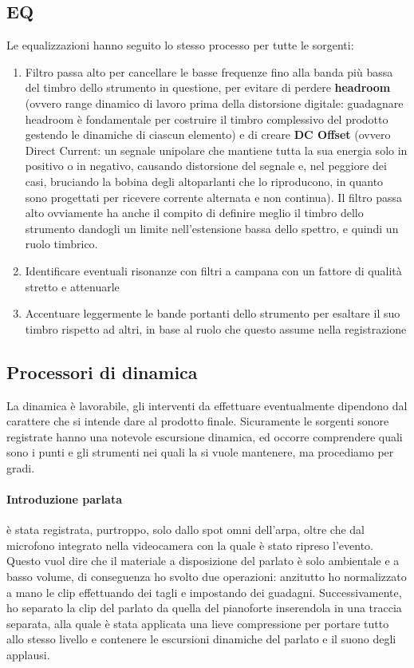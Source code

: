 	\subsection{EQ}
	Le equalizzazioni hanno seguito lo stesso processo per tutte le sorgenti:
		\begin{enumerate}
			\item Filtro passa alto per cancellare le basse frequenze fino alla banda più bassa del timbro dello strumento in questione, per evitare di perdere \textbf{headroom} (ovvero range dinamico di lavoro prima della distorsione digitale: guadagnare headroom è fondamentale per costruire il timbro complessivo del prodotto gestendo le dinamiche di ciascun elemento) e di creare \textbf{DC Offset} (ovvero Direct Current: un segnale unipolare che mantiene tutta la sua energia solo in positivo o in negativo, causando distorsione del segnale e, nel peggiore dei casi, bruciando la bobina degli altoparlanti che lo riproducono, in quanto sono progettati per ricevere corrente alternata e non continua). Il filtro passa alto ovviamente ha anche il compito di definire meglio il timbro dello strumento dandogli un limite nell'estensione bassa dello spettro, e quindi un ruolo timbrico.
			\item Identificare eventuali risonanze con filtri a campana con un fattore di qualità stretto e attenuarle
			\item Accentuare leggermente le bande portanti dello strumento per esaltare il suo timbro rispetto ad altri, in base al ruolo che questo assume nella registrazione
		\end{enumerate}
	
	\subsection{Processori di dinamica}
	La dinamica è lavorabile, gli interventi da effettuare eventualmente dipendono dal carattere che si intende dare al prodotto finale. Sicuramente le sorgenti sonore registrate hanno una notevole escursione dinamica, ed occorre comprendere quali sono i punti e gli strumenti nei quali la si vuole mantenere, ma procediamo per gradi.
	
		\paragraph{Introduzione parlata} è stata registrata, purtroppo, solo dallo spot omni dell'arpa, oltre che dal microfono integrato nella videocamera con la quale è stato ripreso l'evento. Questo vuol dire che il materiale a disposizione del parlato è solo ambientale e a basso volume, di conseguenza ho svolto due operazioni: anzitutto ho normalizzato a mano le clip effettuando dei tagli e impostando dei guadagni. Successivamente, ho separato la clip del parlato da quella del pianoforte inserendola in una traccia separata, alla quale è stata applicata una lieve compressione per portare tutto allo stesso livello e contenere le escursioni dinamiche del parlato e il suono degli applausi.
		
